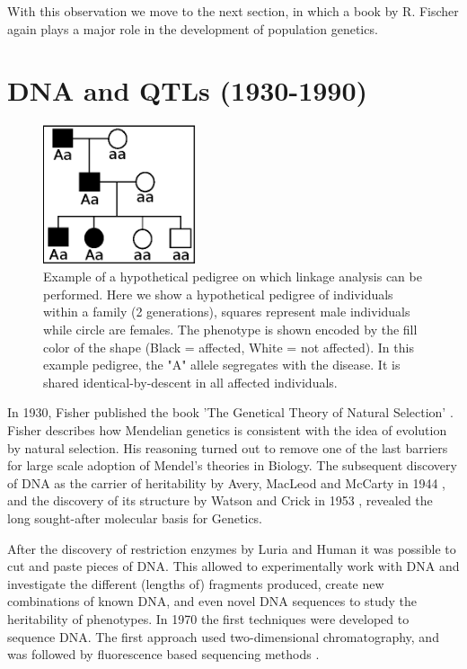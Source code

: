 With this observation we move to the next section, in which a book by R. Fischer again plays a major role in 
the development of population genetics.

\section{DNA and QTLs (1930-1990)}

\begin{figure}
  \centering
  \includegraphics[width=0.4\textwidth]{eps/image_1_2.eps}
  \caption[Example of pedigree based linkage analysis.]
    {Example of a hypothetical pedigree on which linkage analysis can be performed. Here we show a 
    hypothetical pedigree of individuals within a family (2 generations), squares represent 
    male individuals while circle are females. The phenotype is shown encoded by the fill 
    color of the shape (Black = affected, White = not affected).  In this example pedigree, 
    the "A" allele segregates with the disease. It is shared identical-by-descent in all 
    affected individuals. }
    \label{fig:pedigree}
\end{figure}


In 1930, Fisher published the book 'The Genetical Theory of Natural Selection' \cite{Fisher:1930}. Fisher describes 
how Mendelian genetics is consistent with the idea of evolution by natural selection. His reasoning turned out 
to remove one of the last barriers for large scale adoption of Mendel's theories in Biology. The subsequent discovery 
of DNA as the carrier of heritability by Avery, MacLeod and McCarty in 1944 \cite{Avery:1944}, and the discovery of 
its structure by Watson and Crick in 1953 \cite{Watson:1953}, revealed the long sought-after molecular basis for Genetics. 

After the discovery of restriction enzymes by Luria and Human \cite{Luria:1952} it was possible to cut and paste pieces 
of DNA. This allowed to experimentally work with DNA and investigate the different (lengths of) fragments produced, 
create new combinations of known DNA, and even novel DNA sequences to study the heritability of phenotypes. In 1970 
the first techniques were developed to sequence DNA. The first approach used two-dimensional chromatography, and was 
followed by fluorescence based sequencing methods \cite{Pettersson:2009}.

